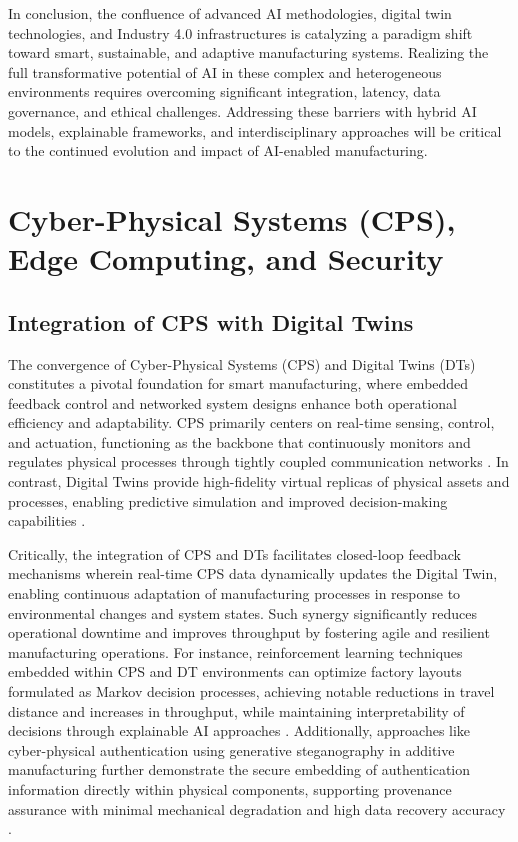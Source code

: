 \documentclass[sigconf]{acmart}
\begin{document}
In conclusion, the confluence of advanced AI methodologies, digital twin technologies, and Industry 4.0 infrastructures is catalyzing a paradigm shift toward smart, sustainable, and adaptive manufacturing systems. Realizing the full transformative potential of AI in these complex and heterogeneous environments requires overcoming significant integration, latency, data governance, and ethical challenges. Addressing these barriers with hybrid AI models, explainable frameworks, and interdisciplinary approaches will be critical to the continued evolution and impact of AI-enabled manufacturing.

\section{Cyber-Physical Systems (CPS), Edge Computing, and Security}

\subsection{Integration of CPS with Digital Twins}

The convergence of Cyber-Physical Systems (CPS) and Digital Twins (DTs) constitutes a pivotal foundation for smart manufacturing, where embedded feedback control and networked system designs enhance both operational efficiency and adaptability. CPS primarily centers on real-time sensing, control, and actuation, functioning as the backbone that continuously monitors and regulates physical processes through tightly coupled communication networks \cite{ref9}. In contrast, Digital Twins provide high-fidelity virtual replicas of physical assets and processes, enabling predictive simulation and improved decision-making capabilities \cite{ref12}.

Critically, the integration of CPS and DTs facilitates closed-loop feedback mechanisms wherein real-time CPS data dynamically updates the Digital Twin, enabling continuous adaptation of manufacturing processes in response to environmental changes and system states. Such synergy significantly reduces operational downtime and improves throughput by fostering agile and resilient manufacturing operations. For instance, reinforcement learning techniques embedded within CPS and DT environments can optimize factory layouts formulated as Markov decision processes, achieving notable reductions in travel distance and increases in throughput, while maintaining interpretability of decisions through explainable AI approaches \cite{ref9}. Additionally, approaches like cyber-physical authentication using generative steganography in additive manufacturing further demonstrate the secure embedding of authentication information directly within physical components, supporting provenance assurance with minimal mechanical degradation and high data recovery accuracy \cite{ref10}.
\end{document}
